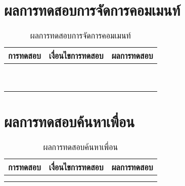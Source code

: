 \section{ผลการทดสอบการจัดการคอมเมนท์}
\begin{table}[H]
	\caption{ผลการทดสอบการจัดการคอมเมนท์}
    \centering	
	\label{tab:test8}
    \begin{tabular}{ | p{4cm} | p{4cm} | p{4cm} |  }
		\hline
	\multicolumn{1}{|c|}{การทดสอบ} & \multicolumn{1}{c|}{เงื่อนไขการทดสอบ} & \multicolumn{1}{c|}{ผลการทดสอบ}\\ \hline
	\setstretch{1.0}{ทดสอบการคอมเมนท์}
	& \setstretch{1.0}{ผู้ใช้เลือกปุ่มลบคอมเมนท์}
	& \setstretch{1.0}{ระบบจะแสดงหน้าคอมเมนท์ }  \\ \cline{2-3} 
	& \setstretch{1.0}{ผู้ใช้กรอกข้อความและส่งคอมเมนท์}
	& \setstretch{1.0}{ระบบจะทำการบันทึกคอมเมนท์ และแสดงยังหน้าคอมเมนท์ } \\ \cline{2-3} 
	& \setstretch{1.0}{ผู้ใช้ไม่กรอกข้อความและส่งคอมเมนท์}
	& \setstretch{1.0}{ระบบจะแสดงข้อความ  กรุณากรอกคอมเมนท์  } \\ \hline
	\setstretch{1.0}{ทดสอบการแก้ไขคอมเมนท์}
	& \setstretch{1.0}{ผู้ใช้เลือกปุ่มแก้ไขคอมเมนท์}
	& \setstretch{1.0}{ระบบจะแสดงหน้าแก้ไขคอมเมนท์ }  \\ \cline{2-3} 
	& \setstretch{1.0}{ผู้ใช้ไม่ได้แก้ไขข้อความคอมเมนท์}
	& \setstretch{1.0}{ระบบจะกลับไปหน้ากระดานข่าว } \\ \cline{2-3} 
	& \setstretch{1.0}{ผู้ใช้แก้ไขข้อความคอมเมนท์}
	& \setstretch{1.0}{ระบบจะกลับไปหน้าคอมเมนท์ และบันทึกข้อมูลลงฐานข้อมูล } \\ \hline
	\setstretch{1.0}{ทดสอบการลบคอมเมนท์}
	& \setstretch{1.0}{ผู้ใช้เลือกปุ่มลบคอมเมนท์}
	& \setstretch{1.0}{ระบบจะแสดงตัวเลือกได้แก่ ยืนยันการลบ และกลับไปหน้าคอมเมนท์ } \\ \cline{2-3} 
	& \setstretch{1.0}{ผู้ใช้เลือกยืนยันการลบคอมเมนท์}
	& \setstretch{1.0}{ระบบจะทำการลบคอมเมนท์ } \\ \cline{2-3} 
	& \setstretch{1.0}{ผู้ใช้เลือกกลับ}
	& \setstretch{1.0}{ระบบจะกลับไปยังหน้าคอมเมนท์ } \\ \hline
    \end{tabular}
\end{table}

\section{ผลการทดสอบค้นหาเพื่อน}
\begin{table}[H]
	\caption{ผลการทดสอบค้นหาเพื่อน}
    \centering	
	\label{tab:test10}
    \begin{tabular}{ | p{4cm} | p{4cm} | p{4cm} |  }
		\hline
	\multicolumn{1}{|c|}{การทดสอบ} & \multicolumn{1}{c|}{เงื่อนไขการทดสอบ} & \multicolumn{1}{c|}{ผลการทดสอบ} \\ \hline
	\setstretch{1.0}{ทดสอบการค้นหาเพื่อน}
	& \setstretch{1.0}{ผู้ใช้กรอกช่องค้นหาเพื่อน}
	& \setstretch{1.0}{ระบบจะแสดงเพื่อนที่ถูกค้นหา }  \\ \cline{2-3} 
	& \setstretch{1.0}{ผู้ใช้กรอกไม่ช่องค้นหาเพื่อน}
	& \setstretch{1.0}{ระบบจะแสดงเพื่อนทั้งหมด } \\ \hline
    \end{tabular}
\end{table}

